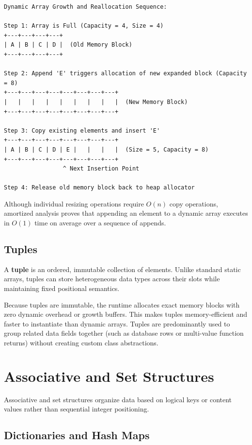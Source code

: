 \documentclass[12pt]{report}
\begin{document}
\begin{verbatim}
Dynamic Array Growth and Reallocation Sequence:

Step 1: Array is Full (Capacity = 4, Size = 4)
+---+---+---+---+
| A | B | C | D |  (Old Memory Block)
+---+---+---+---+

Step 2: Append 'E' triggers allocation of new expanded block (Capacity = 8)
+---+---+---+---+---+---+---+---+
|   |   |   |   |   |   |   |   |  (New Memory Block)
+---+---+---+---+---+---+---+---+

Step 3: Copy existing elements and insert 'E'
+---+---+---+---+---+---+---+---+
| A | B | C | D | E |   |   |   |  (Size = 5, Capacity = 8)
+---+---+---+---+---+---+---+---+
                 ^ Next Insertion Point

Step 4: Release old memory block back to heap allocator
\end{verbatim}

Although individual resizing operations require $O(n)$ copy operations, amortized analysis proves that appending an element to a dynamic array executes in $O(1)$ time on average over a sequence of appends.

\subsection{Tuples}

A \textbf{tuple} is an ordered, immutable collection of elements. Unlike standard static arrays, tuples can store heterogeneous data types across their slots while maintaining fixed positional semantics.

Because tuples are immutable, the runtime allocates exact memory blocks with zero dynamic overhead or growth buffers. This makes tuples memory-efficient and faster to instantiate than dynamic arrays. Tuples are predominantly used to group related data fields together (such as database rows or multi-value function returns) without creating custom class abstractions.

\section{Associative and Set Structures}

Associative and set structures organize data based on logical keys or content values rather than sequential integer positioning.

\subsection{Dictionaries and Hash Maps}
\end{document}
